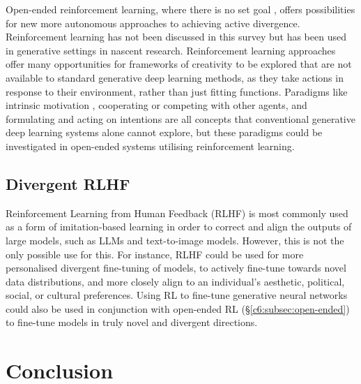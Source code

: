 Open-ended reinforcement learning, where there is no set goal \citep{wang2020enhanced}, offers possibilities for new more autonomous approaches to achieving active divergence. 
Reinforcement learning has not been discussed in this survey but has been used in generative settings \citep{luo2020reinforcement} in nascent research. 
Reinforcement learning approaches offer many opportunities for frameworks of creativity to be explored that are not available to standard generative deep learning methods, as they take actions in response to their environment, rather than just fitting functions. 
Paradigms like intrinsic motivation \citep{shaker2016intrinsically}, cooperating or competing with other agents, and formulating and acting on intentions are all concepts that conventional generative deep learning systems alone cannot explore, but these paradigms could be investigated in open-ended systems utilising reinforcement learning.

\subsection{Divergent RLHF}
\label{c6:subsec:divergent-rlhf}

Reinforcement Learning from Human Feedback (RLHF) is most commonly used as a form of imitation-based learning in order to correct and align the outputs of large models, such as LLMs and text-to-image models. 
However, this is not the only possible use for this.
For instance, RLHF could be used for more personalised divergent fine-tuning of models, to actively fine-tune towards novel data distributions, and more closely align to an individual's aesthetic, political, social, or cultural preferences. 
Using RL to fine-tune generative neural networks could also be used in conjunction with open-ended RL (\S \ref{c6:subsec:open-ended}) to fine-tune models in truly novel and divergent directions. 

\section{Conclusion}

